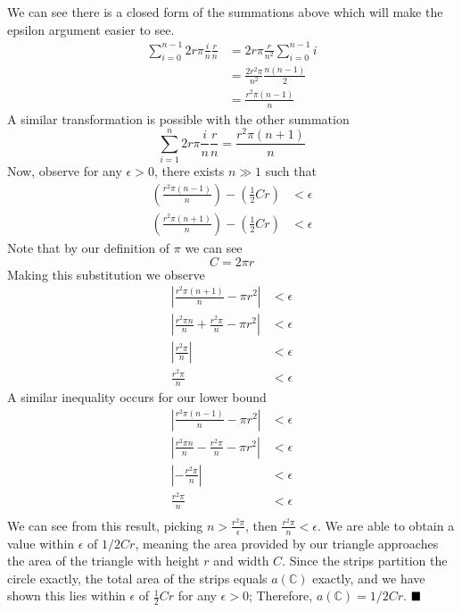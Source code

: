 \documentclass[10pt]{article}
\begin{document}
\begin{enumerate}
        We can see there is a closed form of the summations above which will make the epsilon argument easier to see.
        \begin{align*}
            \sum_{i=0}^{n-1} 2r\pi \frac{i}{n} \frac{r}{n} &= 2r\pi \frac{r}{n^2} \sum_{i=0}^{n-1} i \\
                                                           &= \frac{2r^2 \pi}{n^2} \frac{n (n-1)}{2}\\
                                                           &= \frac{r^2 \pi (n-1)}{n}
        \end{align*}
        A similar transformation is possible with the other summation
        \[\sum_{i=1}^{n} 2r\pi \frac{i}{n} \frac{r}{n} = \frac{r^2 \pi (n+1)}{n}\]
        Now, observe for any $\epsilon > 0$, there exists $n \gg 1$ such that
        \begin{align*}
            \left(\frac{r^2 \pi (n-1)}{n}\right) - \left(\frac{1}{2} Cr\right) &< \epsilon\\
            \left(\frac{r^2 \pi (n+1)}{n}\right) - \left(\frac{1}{2} Cr\right) &< \epsilon
        \end{align*}
        Note that by our definition of $\pi$ we can see
        \[C = 2\pi r\]
        Making this substitution we observe
        \begin{align*}
            \left|\frac{r^2 \pi (n+1)}{n} - \pi r^2\right| &< \epsilon\\
            \left|\frac{r^2 \pi n}{n} + \frac{r^2 \pi}{n} - \pi r^2\right| &< \epsilon\\
            \left|\frac{r^2\pi}{n}\right| &< \epsilon\\
            \frac{r^2\pi}{n} &< \epsilon
        \end{align*}
        A similar inequality occurs for our lower bound
        \begin{align*}
            \left|\frac{r^2 \pi (n-1)}{n} - \pi r^2\right| &< \epsilon\\
            \left|\frac{r^2 \pi n}{n} - \frac{r^2 \pi}{n} - \pi r^2\right| &< \epsilon\\
            \left|-\frac{r^2 \pi}{n}\right| &< \epsilon\\
            \frac{r^2 \pi}{n} &< \epsilon\\
        \end{align*}
        We can see from this result, picking $n > \frac{r^2\pi}{\epsilon}$, then $\frac{r^2\pi}{n} < \epsilon$. We are able to obtain a value within $\epsilon$ of $1/2Cr$, meaning the area provided by our triangle approaches the area of the triangle with height $r$ and width $C$. Since the strips partition the circle exactly, the total area of the strips equals $a(\mathbb{C})$ exactly, and we have shown this lies within $\epsilon$ of $\frac{1}{2}Cr$ for any $\epsilon > 0$; Therefore, $a(\mathbb{C}) = 1/2Cr$. $\hfill\blacksquare$


\end{enumerate}
\end{document}
